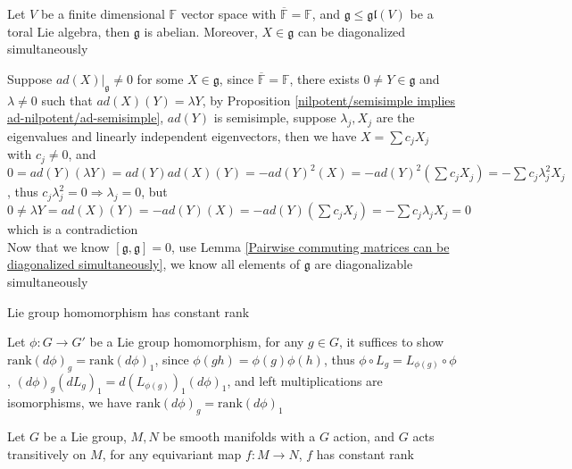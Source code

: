\documentclass[main]{subfiles}
\begin{document}
\begin{exercise}\label{Finite dimensional toral Lie algebra is abelian and its elements can be diagonalized simultaneously}
Let $V$ be a finite dimensional $\mathbb F$ vector space with $\overline{\mathbb F}=\mathbb F$, and $\mathfrak{g}\leq\mathfrak{gl}(V)$ be a toral Lie algebra, then $\mathfrak{g}$ is abelian. Moreover, $X\in\mathfrak{g}$ can be diagonalized simultaneously
\end{exercise}

\begin{solution}
Suppose $ad(X)|_{\mathfrak g}\neq0$ for some $X\in\mathfrak{g}$, since $\overline{\mathbb F}=\mathbb F$, there exists $0\neq Y\in\mathfrak{g}$ and $\lambda\neq0$ such that $ad(X)(Y)=\lambda Y$, by Proposition \ref{nilpotent/semisimple implies ad-nilpotent/ad-semisimple}, $ad(Y)$ is semisimple, suppose $\lambda_j,X_j$ are the eigenvalues and linearly independent eigenvectors, then we have $X=\sum c_jX_j$ with $c_j\neq0$, and $0=ad(Y)(\lambda Y)=ad(Y)ad(X)(Y)=-ad(Y)^2(X)=-ad(Y)^2\left(\sum c_jX_j\right)=-\sum c_j\lambda_j^2X_j$, thus $c_j\lambda_j^2=0\Rightarrow\lambda_j=0$, but $0\neq\lambda Y=ad(X)(Y)=-ad(Y)(X)=-ad(Y)\left(\sum c_jX_j\right)=-\sum c_j\lambda_jX_j=0$ which is a contradiction \\
Now that we know $[\mathfrak{g},\mathfrak{g}]=0$, use Lemma \ref{Pairwise commuting matrices can be diagonalized simultaneously}, we know all elements of $\mathfrak{g}$ are diagonalizable simultaneously
\end{solution}

\begin{exercise}\label{Lie group homomorphism has constant rank}
Lie group homomorphism has constant rank
\end{exercise}

\begin{solution}
Let $\phi:G\to G'$ be a Lie group homomorphism, for any $g\in G$, it suffices to show $\mathrm{rank}(d\phi)_g=\mathrm{rank}(d\phi)_1$, since $\phi(gh)=\phi(g)\phi(h)$, thus $\phi\circ L_g=L_{\phi(g)}\circ\phi$, $(d\phi)_g(dL_g)_1=d(L_{\phi(g)})_1(d\phi)_1$, and left multiplications are isomorphisms, we have $\mathrm{rank}(d\phi)_g=\mathrm{rank}(d\phi)_1$
\end{solution}

\begin{exercise}
Let $G$ be a Lie group, $M,N$ be smooth manifolds with a $G$ action, and $G$ acts transitively on $M$, for any equivariant map $f:M\to N$, $f$ has constant rank
\end{exercise}
\end{document}
